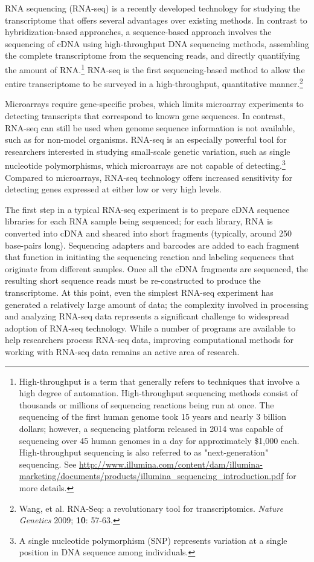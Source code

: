 RNA sequencing (RNA-seq) is a recently developed technology for studying the transcriptome that offers several advantages over existing methods. In contrast to hybridization-based approaches, a sequence-based approach involves the sequencing of cDNA using high-throughput DNA sequencing methods, assembling the complete transcriptome from the sequencing reads, and directly quantifying the amount of RNA.\footnote{High-throughput is a term that generally refers to techniques that involve a high degree of automation. High-throughput sequencing methods consist of thousands or millions of sequencing reactions being run at once. The sequencing of the first human genome took 15 years and nearly 3 billion dollars; however, a sequencing platform released in 2014 was capable of sequencing over 45 human genomes in a day for approximately \$1,000 each. High-throughput sequencing is also referred to as "next-generation" sequencing. See \url{http://www.illumina.com/content/dam/illumina-marketing/documents/products/illumina_sequencing_introduction.pdf} for more details.} RNA-seq is the first sequencing-based method to allow the entire transcriptome to be surveyed in a high-throughput, quantitative manner.\footnote{Wang, et al. RNA-Seq: a revolutionary tool for transcriptomics. \textit{Nature Genetics} 2009; \textbf{10}: 57-63.}

Microarrays require gene-specific probes, which limits microarray experiments to detecting transcripts that correspond to known gene sequences. In contrast, RNA-seq can still be used when genome sequence information is not available, such as for non-model organisms. RNA-seq is an especially powerful tool for researchers interested in studying small-scale genetic variation, such as single nucleotide polymorphisms, which microarrays are not capable of detecting.\footnote{A single nucleotide polymorphism (SNP) represents variation at a single position in DNA sequence among individuals.} Compared to microarrays, RNA-seq technology offers increased sensitivity for detecting genes expressed at either low or very high levels. 

The first step in a typical RNA-seq experiment is to prepare cDNA sequence libraries for each RNA sample being sequenced; for each library, RNA is converted into cDNA and sheared into short fragments (typically, around 250 base-pairs long). Sequencing adapters and barcodes are added to each fragment that function in initiating the sequencing reaction and labeling sequences that originate from different samples. Once all the cDNA fragments are sequenced, the resulting short sequence reads must be re-constructed to produce the transcriptome. At this point, even the simplest RNA-seq experiment has generated a relatively large amount of data; the complexity involved in processing and analyzing RNA-seq data represents a significant challenge to widespread adoption of RNA-seq technology. While a number of programs are available to help researchers process RNA-seq data, improving computational methods for working with RNA-seq data remains an active area of research.

